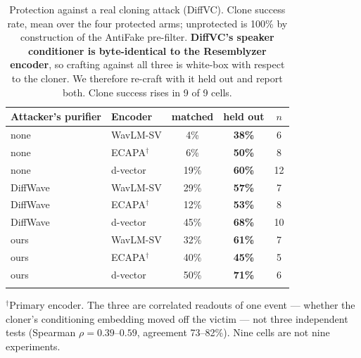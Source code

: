 \begin{table}[t]
\centering
\caption{Protection against a real cloning attack (DiffVC). Clone success rate,
mean over the four protected arms; unprotected is 100\% by construction of the
AntiFake pre-filter. \textbf{DiffVC's speaker conditioner is byte-identical to the
Resemblyzer encoder}, so crafting against all three is white-box with respect to
the cloner. We therefore re-craft with it held out and report both. Clone success
rises in 9 of 9 cells.}
\label{tab:cloning}
\small
\begin{tabular}{llccc}
\toprule
Attacker's purifier & Encoder & matched & held out & $n$ \\
\midrule
none & WavLM-SV & 4\% & \textbf{38\%} & 6 \\
none & ECAPA$^{\dagger}$ & 6\% & \textbf{50\%} & 8 \\
none & d-vector & 19\% & \textbf{60\%} & 12 \\
\addlinespace
DiffWave & WavLM-SV & 29\% & \textbf{57\%} & 7 \\
DiffWave & ECAPA$^{\dagger}$ & 12\% & \textbf{53\%} & 8 \\
DiffWave & d-vector & 45\% & \textbf{68\%} & 10 \\
\addlinespace
ours & WavLM-SV & 32\% & \textbf{61\%} & 7 \\
ours & ECAPA$^{\dagger}$ & 40\% & \textbf{45\%} & 5 \\
ours & d-vector & 50\% & \textbf{71\%} & 6 \\
\addlinespace
\bottomrule
\end{tabular}
\vspace{2pt}
\footnotesize
\raggedright
$^{\dagger}$Primary encoder. The three are correlated readouts of one event ---
whether the cloner's conditioning embedding moved off the victim --- not three
independent tests (Spearman $\rho=0.39$--$0.59$, agreement 73--82\%). Nine cells
are not nine experiments.
\end{table}

